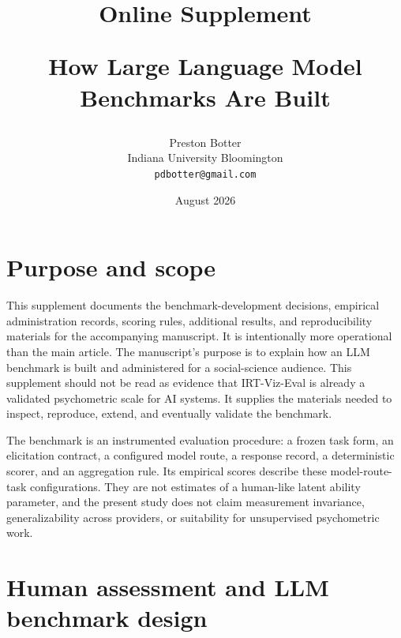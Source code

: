 \documentclass[11pt]{article}
\title{Online Supplement\par\large How Large Language Model Benchmarks Are Built}
\author{Preston Botter\\
\small Indiana University Bloomington\\
\small \texttt{pdbotter@gmail.com}}
\date{August 2026}
\begin{document}
\maketitle

\section{Purpose and scope}

This supplement documents the benchmark-development decisions, empirical administration records, scoring rules, additional results, and reproducibility materials for the accompanying manuscript. It is intentionally more operational than the main article. The manuscript's purpose is to explain how an LLM benchmark is built and administered for a social-science audience. This supplement should not be read as evidence that IRT-Viz-Eval is already a validated psychometric scale for AI systems. It supplies the materials needed to inspect, reproduce, extend, and eventually validate the benchmark.

The benchmark is an instrumented evaluation procedure: a frozen task form, an elicitation contract, a configured model route, a response record, a deterministic scorer, and an aggregation rule. Its empirical scores describe these model-route-task configurations. They are not estimates of a human-like latent ability parameter, and the present study does not claim measurement invariance, generalizability across providers, or suitability for unsupervised psychometric work.

\section{Human assessment and LLM benchmark design}
\end{document}
